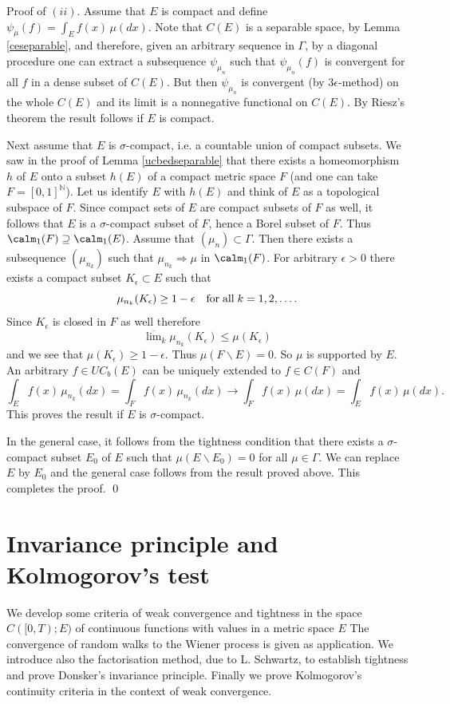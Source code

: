 \documentclass[preprint]{imsart}
\def\N{\mathbb N}
\begin{document}
{Proof of $(ii)$. Assume that $E$ is compact and define
$\psi_\mu(f)=\int_Ef(x)\,\mu(dx)$. Note that $C(E)$ is
a separable space, by Lemma \ref{ceseparable},
 and
therefore, given an arbitrary sequence
in $\Gamma$, by a diagonal procedure
 one can extract a subsequence
$\psi_{\mu_n}$ such that
$\psi_{\mu_n}(f)$ is convergent for all $f$
in a dense subset of $C(E)$. But then  $\psi_{\mu_n}$
is convergent (by $3\epsilon$-method) on the whole
$C(E)$ and its limit is a nonnegative functional on
$C(E)$. By Riesz's theorem the result follows if $E$ is
compact.

Next assume that
$E$ is $\sigma$-compact, i.e. a countable union of
compact subsets.
We saw in the proof of
Lemma \ref{ucbedseparable} that
there exists a
homeomorphism $h$ of $E$ onto a subset
 $h(E)$ of a compact
metric space $F$ (and one can take $F=[0,1]^\N$).
Let us identify $E$ with $h(E)$ and think of
$E$ as a topological subspace of $F$.
Since compact sets of $E$ are compact subsets of $F$
 as well, it follows that $E$ is a $\sigma$-compact subset
 of $F$, hence a Borel subset of $F$.
Thus $\calm_1(F)\supseteq \calm_1(E)$. Assume
that $(\mu_n)\subset \Gamma$. Then there exists a
subsequence $(\mu_{n_k})$ such that
$\mu_{n_k}\Rightarrow \mu$ in $\calm_1(F)$.
For arbitrary $\epsilon >0$ there exists a compact
subset $K_\epsilon \subset E$ such that
$$
\mu_{n_k}(K_\epsilon)\geq 1-\epsilon\quad {\rm for\; all}\;
k=1,2,\ldots.
$$
Since $K_\epsilon$ is closed in $F$ as well
therefore
$$
\overline{\lim}_k \mu_{n_k}(K_\epsilon)\leq \mu(K_\epsilon)
$$
and we see that $\mu(K_\epsilon)\geq 1-\epsilon$. Thus
$\mu(F\backslash E)=0$. So $\mu$ is
supported by $E$. An arbitrary $f\in UC_b(E)$ can be
uniquely extended to $f\in C(F)$ and
$$
\int_Ef(x)\,\mu_{n_k}(dx) =
\int_{F}f(x)\,\mu_{n_k}(dx) \to
\int_{F}f(x)\,\mu (dx)=
\int_Ef(x)\,\mu(dx).
$$
This proves the result if $E$ is $\sigma$-compact.

In the general case, it follows from the tightness
 condition that there exists a
$\sigma$-compact subset $E_0$ of $E$ such that
$\mu (E\backslash E_0)=0$ for all
 $\mu\in\Gamma$. We can replace $E$ by
 $E_0$ and the general case
  follows from the result proved above.
This completes the proof.
\qed


\chapter{Invariance principle and Kolmogorov's test}

We develop  some criteria of weak convergence and tightness  in the space $C([0,T); E)$ of continuous functions
with values in a metric space $E$
The convergence of random walks to the Wiener process is given as application.
We introduce also the factorisation method, due to L. Schwartz,
to establish tightness and prove Donsker's invariance
principle. Finally we prove Kolmogorov's continuity criteria
in the context of weak convergence.
}
\end{document}
